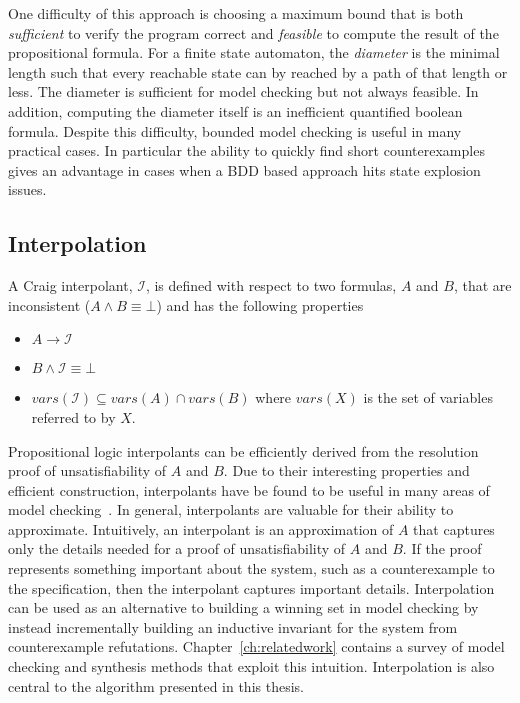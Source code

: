 One difficulty of this approach is choosing a maximum bound that is both \emph{sufficient} to verify the program correct and \emph{feasible} to compute the result of the propositional formula. For a finite state automaton, the \emph{diameter} is the minimal length such that every reachable state can by reached by a path of that length or less. The diameter is sufficient for model checking but not always feasible. In addition, computing the diameter itself is an inefficient quantified boolean formula. Despite this difficulty, bounded model checking is useful in many practical cases. In particular the ability to quickly find short counterexamples gives an advantage in cases when a BDD based approach hits state explosion issues.

\subsection{Interpolation}
\label{sec:backgroundInterpolation}

A Craig interpolant, $\mathcal{I}$, is defined with respect to two formulas, $A$ and $B$, that are inconsistent ($A \land B \equiv \bot$) and has the following properties

\begin{itemize}
    \item $A \to \mathcal{I}$
    \item $B \land \mathcal{I} \equiv \bot$
    \item $vars(\mathcal{I}) \subseteq vars(A) \cap vars(B)$ where $vars(X)$ is the set of variables referred to by $X$.
\end{itemize}

Propositional logic interpolants can be efficiently derived from the resolution proof of unsatisfiability of $A$ and $B$. Due to their interesting properties and efficient construction, interpolants have be found to be useful in many areas of model checking~\cite{McMillan05}. In general, interpolants are valuable for their ability to approximate. Intuitively, an interpolant is an approximation of $A$ that captures only the details needed for a proof of unsatisfiability of $A$ and $B$. If the proof represents something important about the system, such as a counterexample to the specification, then the interpolant captures important details.  Interpolation can be used as an alternative to building a winning set in model checking by instead incrementally building an inductive invariant for the system from counterexample refutations. Chapter~\ref{ch:relatedwork} contains a survey of model checking and synthesis methods that exploit this intuition. Interpolation is also central to the algorithm presented in this thesis.

